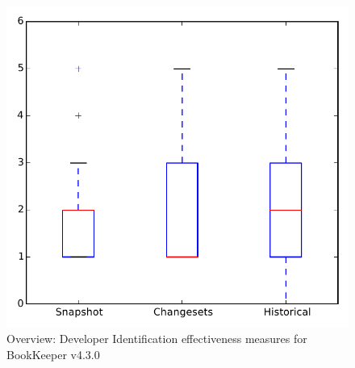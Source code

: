 
\begin{figure}
\centering
\includegraphics[height=0.4\textheight]{figures/dit/all_bookkeeper}
\caption{Overview: Developer Identification effectiveness measures for BookKeeper v4.3.0}
\label{fig:dit:all:bookkeeper}
\end{figure}
